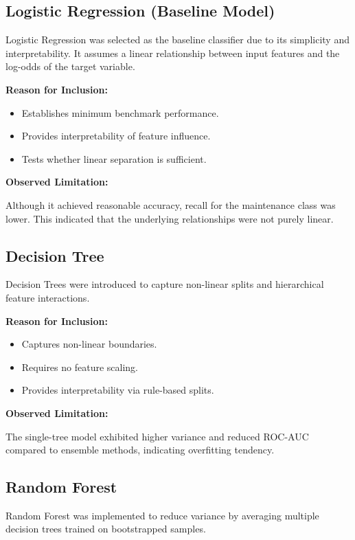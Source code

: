 \documentclass[12pt, a4paper]{article}
\begin{document}
\subsection{Logistic Regression (Baseline Model)}

Logistic Regression was selected as the baseline classifier due to its simplicity and interpretability. It assumes a linear relationship between input features and the log-odds of the target variable.

\textbf{Reason for Inclusion:}
\begin{itemize}
\item Establishes minimum benchmark performance.
\item Provides interpretability of feature influence.
\item Tests whether linear separation is sufficient.
\end{itemize}

\textbf{Observed Limitation:}

Although it achieved reasonable accuracy, recall for the maintenance class was lower. This indicated that the underlying relationships were not purely linear.

\subsection{Decision Tree}

Decision Trees were introduced to capture non-linear splits and hierarchical feature interactions.

\textbf{Reason for Inclusion:}
\begin{itemize}
\item Captures non-linear boundaries.
\item Requires no feature scaling.
\item Provides interpretability via rule-based splits.
\end{itemize}

\textbf{Observed Limitation:}

The single-tree model exhibited higher variance and reduced ROC-AUC compared to ensemble methods, indicating overfitting tendency.

\subsection{Random Forest}

Random Forest was implemented to reduce variance by averaging multiple decision trees trained on bootstrapped samples.
\end{document}
